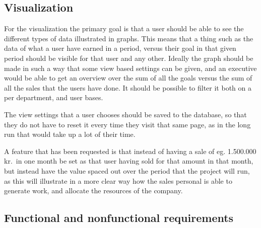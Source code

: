 \subsection{Visualization}
\label{sub:Visualization}
For the visualization the primary goal is that a user should be able to see the
different types of data illustrated in graphs. This means that a thing such as
the data of what a user have earned in a period, versus their goal in that given
period should be visible for that user and any other. Ideally the graph should
be made in such a way that some view based settings can be given, and an
executive would be able to get an overview over the sum of all the goals versus
the sum of all the sales that the users have done. It should be possible to
filter it both on a per department, and user bases. 

The view settings that a user chooses should be saved to the database, so that
they do not have to reset it every time they visit that same page, as in the
long run that would take up a lot of their time. 

A feature that has been requested is that instead of having a sale of eg.
1.500.000 kr.\ in one month be set as that user having sold for that amount in
that month, but instead have the value spaced out over the period that the
project will run, as this will illustrate in a more clear way how the sales
personal is able to generate work, and allocate the resources of the company. 

\subsection{Functional and nonfunctional requirements}
\label{sub:Functional and nonfunctional requirements}

